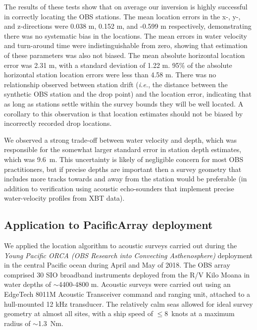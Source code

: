 The results of these tests show that on average our inversion is highly successful in correctly locating the OBS stations. The mean location errors in the x-, y-, and z-directions were 0.038 m, 0.152 m, and -0.599 m respectively, demonstrating there was no systematic bias in the locations. The mean errors in water velocity and turn-around time were indistinguishable from zero, showing that estimation of these parameters was also not biased. The mean absolute horizontal location error was 2.31 m, with a standard deviation of 1.22 m. 95\% of the absolute horizontal station location errors were less than 4.58 m. There was no relationship observed between station drift (\textit{i.e.}, the distance between the synthetic OBS station and the drop point) and the location error, indicating that as long as stations settle within the survey bounds they will be well located. A corollary to this observation is that location estimates should not be biased by incorrectly recorded drop locations. 

We observed a strong trade-off between water velocity and depth, which was responsible for the somewhat larger standard error in station depth estimates, which was \mbox{9.6 m}. This uncertainty is likely of negligible concern for most OBS practitioners, but if precise depths are important then a survey geometry that includes more tracks towards and away from the station would be preferable (in addition to verification using acoustic echo-sounders that implement precise water-velocity profiles from XBT data).

\subsection{Application to PacificArray deployment}
We applied the location algorithm to acoustic surveys carried out during the \textit{Young Pacific ORCA (OBS Research into Convecting Asthenosphere)} deployment in the central Pacific ocean during April and May of 2018. The OBS array comprised 30 SIO broadband instruments deployed from the R/V Kilo Moana in water depths of $\sim$4400-4800 m. Acoustic  surveys were carried out using an EdgeTech 8011M Acoustic Transceiver command and ranging unit, attached to a hull-mounted 12 kHz transducer. The relatively calm seas allowed for ideal survey geometry at almost all sites, with a ship speed of \mbox{$\le$8 knots} at a maximum radius of \mbox{$\sim$1.3 Nm}. 

